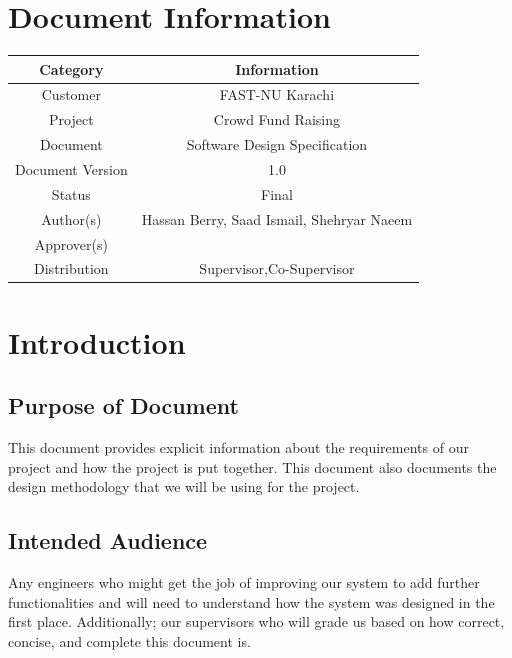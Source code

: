 \documentclass{scrreprt}
\begin{document}
\chapter*{Document Information}

\begin{center}
    \begin{tabular}{|c|c|}
        \hline
	    Category & Information\\
        \hline
        Customer & FAST-NU Karachi\\
        \hline
        Project & Crowd Fund Raising\\
        \hline
        Document & Software Design Specification\\
        \hline
        Document Version & 1.0\\
        \hline
        Status & Final\\
        \hline
        Author(s) & Hassan Berry, Saad Ismail, Shehryar Naeem\\
        \hline
        Approver(s) &\\
        \hline
        Distribution & Supervisor,Co-Supervisor\\
        \hline
        
    \end{tabular}
\end{center}

\tableofcontents

\chapter{Introduction}

\section{Purpose of Document}
This document provides explicit information about the requirements of our project and how the project is put together. This document also documents the design methodology that we will be using for the project.

\section{Intended Audience}
Any engineers who might  get the job of improving our system to add further functionalities and will need to understand how the system was designed in the first place. Additionally; our supervisors who will grade us based on how correct, concise, and complete this document is.
\end{document}
